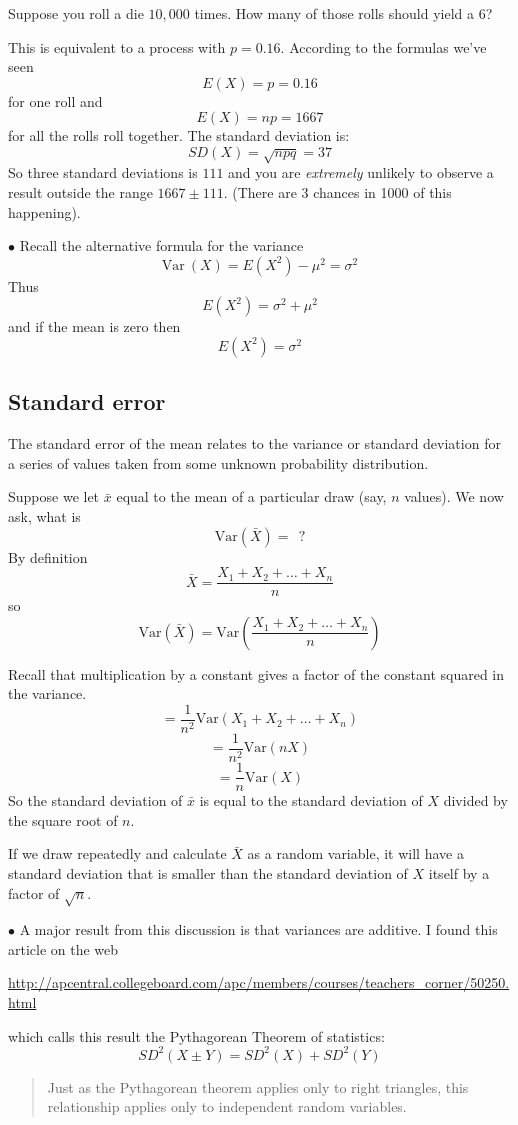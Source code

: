\documentclass[11pt, oneside]{article}   	%
\begin{document}
Suppose you roll a die $10,000$ times.  How many of those rolls should yield a $6$?

This is equivalent to a process with $p = 0.16$.  According to the formulas we've seen
\[ E(X) = p = 0.16 \]
 for one roll and
\[ E(X) = np = 1667 \]
for all the rolls roll together.  The standard deviation is:
\[ SD(X) = \sqrt{npq} = 37\]
So three standard deviations is $111$ and you are \emph{extremely} unlikely to observe a result outside the range $1667 \pm 111$.  (There are 3 chances in 1000 of this happening).

$\bullet$ Recall the alternative formula for the variance
\[ \text{Var} \ (X) = E(X^2) - \mu^2 = \sigma^2 \]
Thus
\[ E(X^2) = \sigma^2 + \mu^2 \]
and if the mean is zero then
\[ E(X^2) = \sigma^2  \]

 \subsection*{Standard error}
 The standard error of the mean relates to the variance or standard deviation for a series of values taken from some unknown probability distribution.
 
 Suppose we let $\bar{x}$ equal to the mean of a particular draw (say, $n$ values).  We now ask, what is
\[ \text{Var}(\bar{X}) = \ \ ? \]
By definition
\[ \bar{X} = \frac{X_1 + X_2 + \dots + X_n}{n} \]
so
\[ \text{Var}(\bar{X}) = \text{Var}( \frac{X_1 + X_2 + \dots + X_n}{n}) \]

Recall that multiplication by a constant gives a factor of the constant squared in the variance.
\[ = \frac{1}{n^2} \text{Var}(X_1 + X_2 + \dots + X_n) \]
\[ = \frac{1}{n^2} \text{Var}(n X) \]
\[ = \frac{1}{n} \text{Var}(X) \]
So the standard deviation of $\bar{x}$ is equal to the standard deviation of $X$ divided by the square root of $n$.

If we draw repeatedly and calculate $\bar{X}$ as a random variable, it will have a standard deviation that is smaller than the standard deviation of $X$ itself by a factor of $\sqrt{n}$.

$\bullet$ A major result from this discussion is that variances are additive.  I found this article on the web

\small
\url{http://apcentral.collegeboard.com/apc/members/courses/teachers_corner/50250.html}
\Large

which calls this result the Pythagorean Theorem of statistics:
\[ SD^2(X \pm Y) = SD^2(X) + SD^2(Y) \]

\begin{quote}\color{blue}Just as the Pythagorean theorem applies only to right triangles, this relationship applies only to independent random variables.\color{black}\end{quote}
\end{document}
